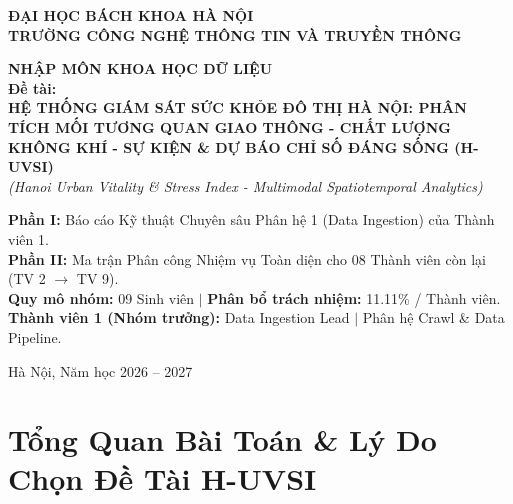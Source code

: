 \documentclass[12pt,a4paper]{article}
\begin{document}
\begin{titlepage}
    \centering
    \vspace*{0.5cm}
    {\Large \textbf{ĐẠI HỌC BÁCH KHOA HÀ NỘI}}\\[0.2cm]
    {\large \textbf{TRƯỜNG CÔNG NGHỆ THÔNG TIN VÀ TRUYỀN THÔNG}}\\[1.5cm]
    
    \begin{tcolorbox}[colback=blue!5!white, colframe=blue!75!black, title=\centering\Large\textbf{BÁO CÁO BÀI TẬP LỚN HỌC PHẦN (IT4142)}, arc=6pt]
        \centering\vspace{0.3cm}
        {\LARGE \textbf{NHẬP MÔN KHOA HỌC DỮ LIỆU}}\\[0.4cm]
        {\large \textbf{Đề tài:}} \\[0.2cm]
        {\Large \textbf{HỆ THỐNG GIÁM SÁT SỨC KHỎE ĐÔ THỊ HÀ NỘI: PHÂN TÍCH MỐI TƯƠNG QUAN GIAO THÔNG - CHẤT LƯỢNG KHÔNG KHÍ - SỰ KIỆN \& DỰ BÁO CHỈ SỐ ĐÁNG SỐNG (H-UVSI)}}\\[0.3cm]
        \textit{(Hanoi Urban Vitality \& Stress Index - Multimodal Spatiotemporal Analytics)}
        \vspace{0.3cm}
    \end{tcolorbox}
    
    \vspace{1.5cm}
    
    \begin{minipage}{0.9\textwidth}
        \textbf{Phần I:} Báo cáo Kỹ thuật Chuyên sâu Phân hệ 1 (Data Ingestion) của Thành viên 1.\\[0.2cm]
        \textbf{Phần II:} Ma trận Phân công Nhiệm vụ Toàn diện cho 08 Thành viên còn lại (TV 2 $\to$ TV 9).\\[0.2cm]
        \textbf{Quy mô nhóm:} 09 Sinh viên \quad $\vert$ \quad \textbf{Phân bổ trách nhiệm:} 11.11\% / Thành viên.\\[0.2cm]
        \textbf{Thành viên 1 (Nhóm trưởng):} Data Ingestion Lead $\vert$ Phân hệ Crawl \& Data Pipeline.
    \end{minipage}
    
    \vfill
    {\large Hà Nội, Năm học 2026 -- 2027}
\end{titlepage}

\tableofcontents
\newpage

\section{Tổng Quan Bài Toán \& Lý Do Chọn Đề Tài H-UVSI}
\end{document}
